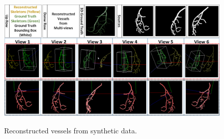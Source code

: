 \documentclass[10pt, conference, compsocconf]{IEEEtran}
\begin{document}

\begin{figure}
  \centering
  \includegraphics[width=7.0in]{experiments_full.png}\\
  \caption{Reconstructed vessels from synthetic
    data.}\label{fig:experiments_full}
\end{figure}
\end{document}
